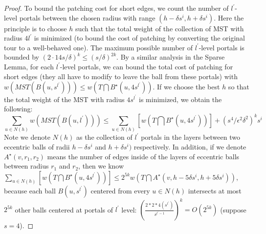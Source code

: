 \documentclass{llncs}
\begin{document}
\begin{proof}
To bound the patching cost for short edges, we count the number of $l^\prime$-level portals between the chosen radius with range $(h-\delta s^i, h+\delta s^i)$.
Here the principle is to choose $h$ such that the total weight of the collection of MST with radius $4l^\prime$ is minimized (to bound the cost of patching by converting the original tour to a well-behaved one).
The maximum possible number of $l^\prime$-level portals is bounded by $(2\cdot 14s/\delta)^k\leq (s/\delta)^{2k}$.
By a similar analysis in the Sparse Lemma, for each $l^\prime$-level portals, we can bound the total cost of patching for short edges (they all have to modify to leave the ball from these portals) with $w(MST(B(u,s^{l^\prime})))\leq w(T\bigcap B^\star(u,4s^{l^\prime}))$.
If we choose the best $h$ so that the total weight of the MST with radius $4s^{l^\prime}$ is minimized, we obtain
the following: 
\begin{equation}
\sum_{u\in N(h)}w(MST(B(u,l^\prime)))\leq\sum_{u\in N(h)}[w(T\bigcap B^\star(u,4s^{l^\prime}))]+(s^4/{\epsilon^2\delta^2})^ks^i
\end{equation}
Note we denote $N(h)$ as the collection of $l^\prime$ portals in the layers between two eccentric balls of radii $h-\delta s^i$ and $h+\delta s^i)$ respectively. 
In addition, if we denote $A^\star(v,r_1,r_2)$ means the number of edges inside of the layers of eccentric balls between radius $r_1$ and $r_2$, then we know $\sum_{u\in N(h)}[w(T\bigcap B^\star(u,4s^{l^\prime}))]\leq 2^{5k}w(T\bigcap A^\star(v,h-5\delta s^i,h+5\delta s^i))$, because each ball $B(u,s^{l^\prime})$ centered from every $u\in N(h)$ intersects at most $2^{5k}$ other balls centered at portals of $l^\prime$ level: $(\frac{2*2*4(s^{l^\prime})}{s^{l^\prime-1}})^k=O(2^{5k})$ (suppose $s=4$).


\end{proof}
\end{document}
